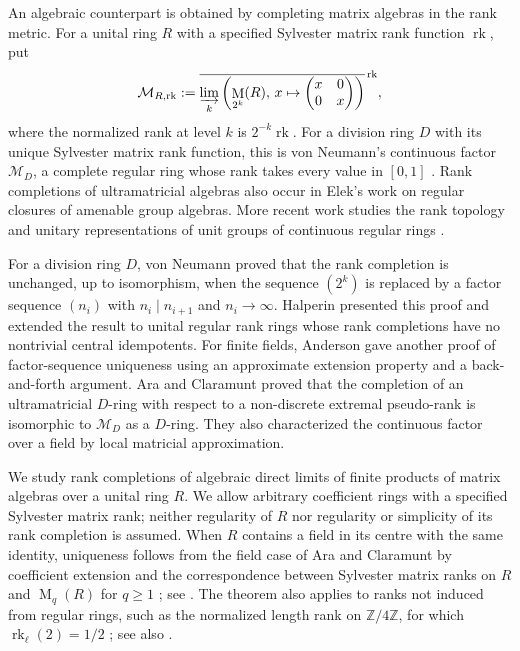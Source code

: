 \documentclass[11pt]{amsart}
\DeclareMathOperator{\rk}{rk}
\DeclareMathOperator{\Mat}{M}
\theoremstyle{definition}
\theoremstyle{remark}
\begin{document}
An algebraic counterpart is obtained by completing matrix algebras in
the rank metric.
For a unital ring $R$ with a specified Sylvester matrix rank function $\rk$, put
\[
 \mathcal M_{R,\rk}
 :=\overline{\varinjlim_k
 \left(\Mat_{2^k}(R),\,x\mapsto
 \begin{pmatrix*}[c]
  x & 0\\
  0 & x
 \end{pmatrix*}\right)}^{\,\rk},
\]
where the normalized rank at level $k$ is $2^{-k}\rk$.
For a division ring $D$ with its unique Sylvester matrix rank function, this is
von Neumann's continuous factor $\mathcal M_D$, a complete regular ring whose rank
takes every value in $[0,1]$ \cite{Goodearl1991,Halperin1968}.
Rank completions of ultramatricial algebras also occur in Elek's work
\cite{Elek2013} on regular closures of amenable group algebras.
More recent work studies the rank topology and unitary representations of unit
groups of continuous regular rings
\cite{Schneider2024,Schneider2026,SchneiderThom2026}.

For a division ring $D$, von Neumann proved that the rank completion
is unchanged, up to isomorphism, when the sequence $(2^k)$ is replaced
by a factor sequence $(n_i)$ with $n_i\mid n_{i+1}$ and $n_i\to\infty$.
Halperin \cite{Halperin1968} presented this proof and extended the result
to unital regular rank rings whose rank completions have no nontrivial
central idempotents.
For finite fields, Anderson \cite[Section~4.2]{Anderson2017} gave another
proof of factor-sequence uniqueness using an approximate extension
property and a back-and-forth argument.
Ara and Claramunt \cite[Theorems~2.2 and 3.2]{AraClaramunt2018}
proved that the completion of an
ultramatricial $D$-ring with respect to a non-discrete extremal
pseudo-rank is isomorphic to $\mathcal M_D$ as a $D$-ring.
They also characterized the continuous factor over a field by local matricial
approximation.

We study rank completions of algebraic direct limits of finite
products of matrix algebras over a unital ring $R$.
We allow arbitrary coefficient rings with a specified Sylvester matrix
rank; neither regularity of $R$ nor regularity or simplicity of its
rank completion is assumed.
When $R$ contains a field in its centre with the same identity,
uniqueness follows from
the field case of Ara and Claramunt by coefficient extension and
the correspondence between Sylvester matrix ranks on $R$ and
$\Mat_q(R)$ for $q\geq1$ \cite[Proposition~1.4]{JaikinLopez2020};
see .
The theorem also applies to ranks not induced from regular rings, such as
the normalized length rank on $\mathbb Z/4\mathbb Z$, for which
$\rk_\ell(2)=1/2$ \cite[Example~2.1.13]{LopezAlvarez2021}; see also
\cite[Remark~4.6]{HungLi2023}.
\end{document}
